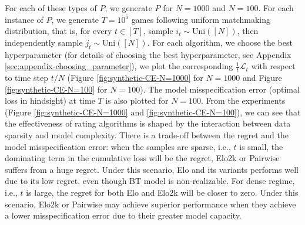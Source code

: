 For each of these types of $P$, we generate $P$ for $N=1000$ and $N=100$. For each instance of $P$, we generate $T=10^5$ games following uniform matchmaking distribution, that is, for every $t\in [T]$, sample $i_t \sim \text{Uni}([N])$, then independently sample $j_t \sim \text{Uni}([N])$. For each algorithm, we choose the best hyperparameter (for details of choosing the best hyperparameter, see Appendix \ref{sec:appendix-choosing_parameter}), we plot the corresponding $\frac1t \mathcal{L}_t$ with respect to time step $t/N$ (Figure \ref{fig:synthetic-CE-N=1000} for $N=1000$ and Figure \ref{fig:synthetic-CE-N=100} for $N=100$). The model misspecification error (optimal loss in hindsight) at time $T$ is also plotted for $N=100$. From the experiments (Figure \ref{fig:synthetic-CE-N=1000} and \ref{fig:synthetic-CE-N=100}), we can see that the effectiveness of rating algorithms is shaped by the interaction between data sparsity and model complexity. There is a trade-off between the regret and the model misspecification error:
when the samples are sparse, i.e., $t$ is small, the dominating term in the cumulative loss will be the regret, Elo2k or Pairwise suffers from a huge regret. Under this scenario, Elo and its variants performs well due to its low regret, even though BT model is non-realizable. For dense regime, i.e., $t$ is large, the regret for both Elo and Elo2k will be closer to zero. Under this scenario, Elo2k or Pairwise may achieve superior performance when they achieve a lower misspecification error due to their greater model capacity.




